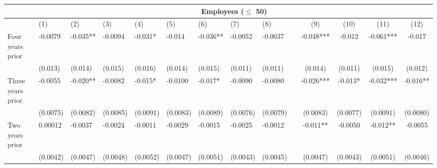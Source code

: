 \begin{tabular}{lccccrrrrrcccc}
\toprule
      & \multicolumn{13}{c}{Employees ($\leq$ 50)} \\
\midrule
      & \multicolumn{1}{l}{(1)} & \multicolumn{1}{l}{(2)} & \multicolumn{1}{l}{(3)} & \multicolumn{1}{l}{(4)} & \multicolumn{1}{l}{(5)} & \multicolumn{1}{l}{(6)} & \multicolumn{1}{l}{(7)} & \multicolumn{1}{l}{(8)} &       & (9)   & (10)  & (11)  & (12) \\
\midrule
\midrule
Four years prior & \multicolumn{1}{l}{-0.0079} & \multicolumn{1}{l}{-0.035**} & \multicolumn{1}{l}{-0.0094} & \multicolumn{1}{l}{-0.031*} & \multicolumn{1}{l}{-0.014} & \multicolumn{1}{l}{-0.036**} & \multicolumn{1}{l}{-0.0052} & \multicolumn{1}{l}{-0.0037} &       & -0.048*** & -0.012 & -0.061*** & -0.017 \\
      & \multicolumn{1}{l}{(0.013)} & \multicolumn{1}{l}{(0.014)} & \multicolumn{1}{l}{(0.015)} & \multicolumn{1}{l}{(0.016)} & \multicolumn{1}{l}{(0.014)} & \multicolumn{1}{l}{(0.015)} & \multicolumn{1}{l}{(0.011)} & \multicolumn{1}{l}{(0.011)} &       & (0.014) & (0.011) & (0.015) & (0.012) \\
Three years prior & \multicolumn{1}{l}{-0.0055} & \multicolumn{1}{l}{-0.020**} & \multicolumn{1}{l}{-0.0082} & \multicolumn{1}{l}{-0.015*} & \multicolumn{1}{l}{-0.0100} & \multicolumn{1}{l}{-0.017*} & \multicolumn{1}{l}{-0.0090} & \multicolumn{1}{l}{-0.0080} &       & -0.026*** & -0.013* & -0.032*** & -0.016** \\
      & \multicolumn{1}{l}{(0.0075)} & \multicolumn{1}{l}{(0.0082)} & \multicolumn{1}{l}{(0.0085)} & \multicolumn{1}{l}{(0.0091)} & \multicolumn{1}{l}{(0.0083)} & \multicolumn{1}{l}{(0.0089)} & \multicolumn{1}{l}{(0.0076)} & \multicolumn{1}{l}{(0.0079)} &       & (0.0083) & (0.0077) & (0.0091) & (0.0080) \\
Two years prior & \multicolumn{1}{l}{0.00012} & \multicolumn{1}{l}{-0.0037} & \multicolumn{1}{l}{-0.0024} & \multicolumn{1}{l}{-0.0011} & \multicolumn{1}{l}{-0.0029} & \multicolumn{1}{l}{-0.0015} & \multicolumn{1}{l}{-0.0025} & \multicolumn{1}{l}{-0.0012} &       & -0.011** & -0.0050 & -0.012** & -0.0055 \\
      & \multicolumn{1}{l}{(0.0042)} & \multicolumn{1}{l}{(0.0047)} & \multicolumn{1}{l}{(0.0048)} & \multicolumn{1}{l}{(0.0052)} & \multicolumn{1}{l}{(0.0047)} & \multicolumn{1}{l}{(0.0051)} & \multicolumn{1}{l}{(0.0043)} & \multicolumn{1}{l}{(0.0045)} &       & (0.0047) & (0.0043) & (0.0051) & (0.0046) \\

\end{tabular}
